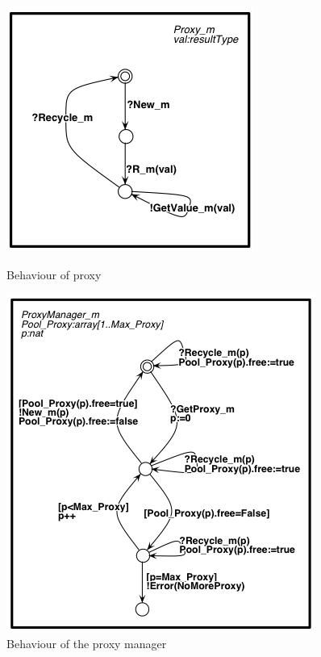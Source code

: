 		
	
	\begin{figure}%
	\begin{minipage}[b]{0.4\linewidth} 
	\centering
	\includegraphics[width=\textwidth]{figures/chapter2/proxy.png}
	\caption{Behaviour of proxy}
	\label{fig:proxy}
	\end{minipage}
	\hspace{0.25cm}
	\begin{minipage}[b]{0.4\linewidth} 
	\centering
	\includegraphics[width=\textwidth]{figures/chapter2/pm.png}
	\caption{Behaviour of the proxy manager}
	\label{fig:pm}
	\end{minipage}
	\end{figure}	  		
	
